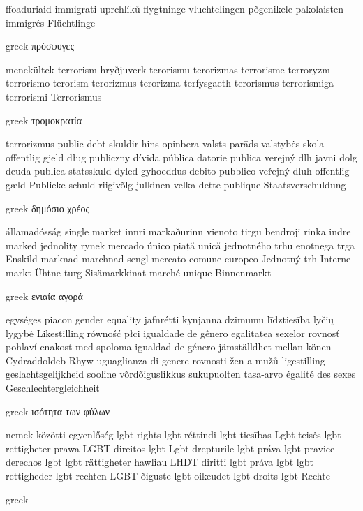 \begin{multicols}{3}
{ffoaduriaid
immigrati
uprchlíků
flygtninge
vluchtelingen
põgenikele
pakolaisten
immigrés
Flüchtlinge
\begin{otherlanguage*}{greek}
πρόσφυγες
\end{otherlanguage*}
menekültek
terrorism
hryðjuverk
terorismu
terorizmas
terrorisme
terroryzm
terrorismo
terorism
terorizmus
terorizma
terfysgaeth
terorismus
terrorismiga
terrorismi
Terrorismus
\begin{otherlanguage*}{greek}
τρομοκρατία
\end{otherlanguage*}
terrorizmus
public debt
skuldir hins opinbera
valsts parāds
valstybės skola
offentlig gjeld
dług publiczny
dívida pública
datorie publica
verejný dlh
javni dolg
deuda publica
statsskuld
dyled gyhoeddus
debito pubblico
veřejný dluh
offentlig gæld
Publieke schuld
riigivõlg
julkinen velka
dette publique
Staatsverschuldung
\begin{otherlanguage*}{greek}
δημόσιο χρέος
\end{otherlanguage*}
államadósság
single market
innri markaðurinn
vienoto tirgu
bendroji rinka
indre marked
jednolity rynek
mercado único
piață unică
jednotného trhu
enotnega trga
Enskild marknad
marchnad sengl
mercato comune europeo
Jednotný trh
Interne markt
Ühtne turg
Sisämarkkinat
marché unique
Binnenmarkt
\begin{otherlanguage*}{greek}
ενιαία αγορά
\end{otherlanguage*}
egységes piacon
gender equality
jafnrétti kynjanna
dzimumu līdztiesība
lyčių lygybė
Likestilling
równość płci
igualdade de gênero
egalitatea sexelor
rovnosť pohlaví
enakost med spoloma
igualdad de género
jämställdhet mellan könen
Cydraddoldeb Rhyw
uguaglianza di genere
rovnosti žen a mužů
ligestilling
geslachtsgelijkheid
sooline võrdõiguslikkus
sukupuolten tasa-arvo
égalité des sexes
Geschlechtergleichheit
\begin{otherlanguage*}{greek}
ισότητα των φύλων
\end{otherlanguage*}
nemek közötti egyenlőség
lgbt rights
lgbt réttindi
lgbt tiesības
Lgbt teisės
lgbt rettigheter
prawa LGBT
direitos lgbt
Lgbt drepturile
lgbt práva
lgbt pravice
derechos lgbt
lgbt rättigheter
hawliau LHDT
diritti lgbt
práva lgbt
lgbt rettigheder
lgbt rechten
LGBT õiguste
lgbt-oikeudet
lgbt droits
lgbt Rechte
\begin{otherlanguage*}{greek}

\end{otherlanguage*}}
\end{multicols}
